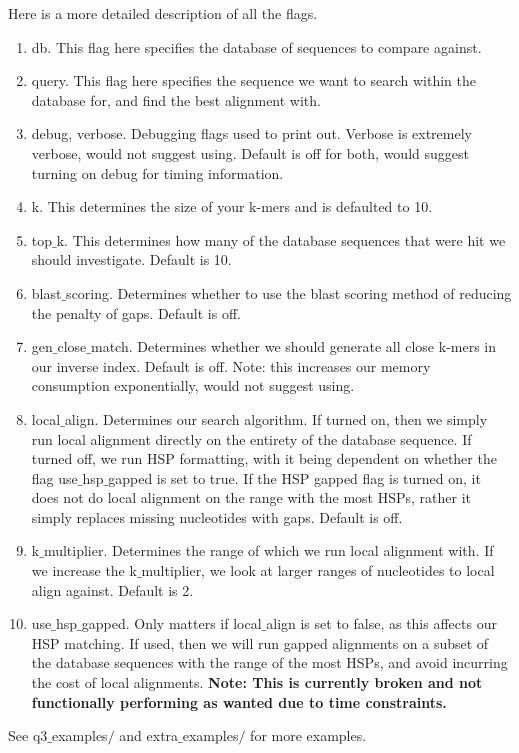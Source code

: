 \documentclass[10pt]{article}
\begin{document}
Here is a more detailed description of all the flags.
\begin{enumerate}
    \item db. This flag here specifies the database of sequences to compare against.
    \item query. This flag here specifies the sequence we want to search within the database for, and find the best alignment with.
    \item debug, verbose. Debugging flags used to print out. Verbose is extremely verbose, would not suggest using. Default is off for both, would suggest turning on debug for timing information.
    \item k. This determines the size of your k-mers and is defaulted to 10.
    \item top$\_$k. This determines how many of the database sequences that were hit we should investigate. Default is 10.
    \item blast$\_$scoring. Determines whether to use the blast scoring method of reducing the penalty of gaps. Default is off.
    \item gen$\_$close$\_$match. Determines whether we should generate all close k-mers in our inverse index. Default is off. Note: this increases our memory consumption exponentially, would not suggest using.
    \item local$\_$align. Determines our search algorithm. If turned on, then we simply run local alignment directly on the entirety of the database sequence. If turned off, we run HSP formatting, with it being dependent on whether the flag use$\_$hsp$\_$gapped is set to true. If the HSP gapped flag is turned on, it does not do local alignment on the range with the most HSPs, rather it simply replaces missing nucleotides with gaps. Default is off.
    \item k$\_$multiplier. Determines the range of which we run local alignment with. If we increase the k$\_$multiplier, we look at larger ranges of nucleotides to local align against. Default is 2.
    \item use$\_$hsp$\_$gapped. Only matters if local$\_$align is set to false, as this affects our HSP matching. If used, then we will run gapped alignments on a subset of the database sequences with the range of the most HSPs, and avoid incurring the cost of local alignments. \textbf{Note: This is currently broken and not functionally performing as wanted due to time constraints.}
\end{enumerate}

See q3$\_$examples$/$ and extra$\_$examples$/$ for more examples.
\end{document}
